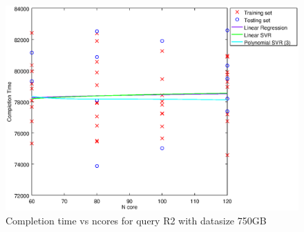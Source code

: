 
\begin {figure}[hbtp]
\centering
\includegraphics[width=\textwidth]{output/R2_750_1_OVER_NCORES/plot_R2_750_bestmodels.eps}
\caption{Completion time vs ncores for query R2 with datasize 750GB}
\label{fig:all_nonlinear_R2_750}
\end {figure}
